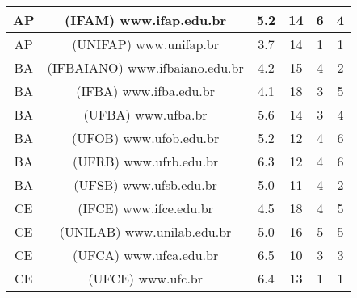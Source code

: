 \begin{center}
\begin{longtable}{|c|l|l|l|l|l|}
\hline
\multicolumn{1}{|c|}{AP} & \multicolumn{1}{c|}{(IFAM) www.ifap.edu.br} & \multicolumn{1}{c|}{5.2} & \multicolumn{1}{c|}{14} & \multicolumn{1}{c|}{6} & \multicolumn{1}{c|}{4} \\ 
\hline
\multicolumn{1}{|c|}{AP} & \multicolumn{1}{c|}{(UNIFAP) www.unifap.br} & \multicolumn{1}{c|}{3.7} & \multicolumn{1}{c|}{14} & \multicolumn{1}{c|}{1} & \multicolumn{1}{c|}{1} \\ 
\hline
\multicolumn{1}{|c|}{BA} & \multicolumn{1}{c|}{(IFBAIANO) www.ifbaiano.edu.br} & \multicolumn{1}{c|}{4.2} & \multicolumn{1}{c|}{15} & \multicolumn{1}{c|}{4} & \multicolumn{1}{c|}{2} \\ 
\hline
\multicolumn{1}{|c|}{BA} & \multicolumn{1}{c|}{(IFBA) www.ifba.edu.br} & \multicolumn{1}{c|}{4.1} & \multicolumn{1}{c|}{18} & \multicolumn{1}{c|}{3} & \multicolumn{1}{c|}{5} \\ 
\hline
\multicolumn{1}{|c|}{BA} & \multicolumn{1}{c|}{(UFBA) www.ufba.br} & \multicolumn{1}{c|}{5.6} & \multicolumn{1}{c|}{14} & \multicolumn{1}{c|}{3} & \multicolumn{1}{c|}{4} \\ 
\hline
\multicolumn{1}{|c|}{BA} & \multicolumn{1}{c|}{(UFOB) www.ufob.edu.br} & \multicolumn{1}{c|}{5.2} & \multicolumn{1}{c|}{12} & \multicolumn{1}{c|}{4} & \multicolumn{1}{c|}{6} \\ 
\hline
\multicolumn{1}{|c|}{BA} & \multicolumn{1}{c|}{(UFRB) www.ufrb.edu.br} & \multicolumn{1}{c|}{6.3} & \multicolumn{1}{c|}{12} & \multicolumn{1}{c|}{4} & \multicolumn{1}{c|}{6} \\ 
\hline
\multicolumn{1}{|c|}{BA} & \multicolumn{1}{c|}{(UFSB) www.ufsb.edu.br} & \multicolumn{1}{c|}{5.0} & \multicolumn{1}{c|}{11} & \multicolumn{1}{c|}{4} & \multicolumn{1}{c|}{2} \\ 
\hline
\multicolumn{1}{|c|}{CE} & \multicolumn{1}{c|}{(IFCE) www.ifce.edu.br} & \multicolumn{1}{c|}{4.5} & \multicolumn{1}{c|}{18} & \multicolumn{1}{c|}{4} & \multicolumn{1}{c|}{5} \\ 
\hline
\multicolumn{1}{|c|}{CE} & \multicolumn{1}{c|}{(UNILAB) www.unilab.edu.br} & \multicolumn{1}{c|}{5.0} & \multicolumn{1}{c|}{16} & \multicolumn{1}{c|}{5} & \multicolumn{1}{c|}{5} \\ 
\hline
\multicolumn{1}{|c|}{CE} & \multicolumn{1}{c|}{(UFCA) www.ufca.edu.br} & \multicolumn{1}{c|}{6.5} & \multicolumn{1}{c|}{10} & \multicolumn{1}{c|}{3} & \multicolumn{1}{c|}{3} \\ 
\hline
\multicolumn{1}{|c|}{CE} & \multicolumn{1}{c|}{(UFCE) www.ufc.br} & \multicolumn{1}{c|}{6.4} & \multicolumn{1}{c|}{13} & \multicolumn{1}{c|}{1} & \multicolumn{1}{c|}{1} \\ 

\end{longtable}
\end{center}
